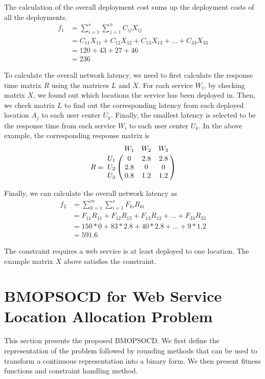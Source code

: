 \documentclass[10pt,journal,compsoc]{IEEEtran}
\let\bbordermatrix\bordermatrix
\begin{document}
The calculation of the overall deployment cost sums up the deployment costs of all the deployments.
\small
\begin{align*}
f_1 & = \sum\limits_{i=1}^s \sum\limits_{j = 1}^n C_{ij} X_{ij}\\
& = C_{11} X_{11} + C_{12} X_{12} + C_{13} X_{13} + ... + C_{33} X_{33} \\
& = 120 + 43 + 27 + 46 \\
& = 236
\end{align*}
 \normalsize

To calculate the overall network latency, we need to first calculate the response time matrix $R$ using the matrices $L$ and $X$. For each service $W_i$, by checking matrix $X$, we found out which locations the service has been deployed in. Then, we check matrix $L$ to find out the corresponding latency from each deployed location $A_j$ to each user center $U_k$. Finally, the smallest latency is selected to be the response time from each service $W_i$ to each user center $U_k$. In the above example, the corresponding response matrix is
\small
$$
R = \bbordermatrix{~ & W_{1} & W_{2} & W_{3}\cr
	U_{1}	&0 &2.8 &2.8	\cr
	U_{2}	&2.8  &0 &0	\cr
	U_{3}	&0.8 &1.2 &1.2	\cr}
$$
\normalsize

Finally, we can calculate the overall network latency as
\small
\begin{equation*}
\begin{aligned}
f_2 & = \sum\limits_{k=1}^m \sum\limits_{i=1}^s F_{ki} R_{ki}\\
  & = F_{11} R_{11} + F_{12} R_{12} + F_{13} R_{13} + ... + F_{33} R_{33} \\
  &= 150 * 0 + 83 * 2.8 + 40 * 2.8 + \dots + 9 * 1.2 \\
  &= 591.6
\end{aligned}
\end{equation*}
\normalsize


The constraint requires a web service is at least deployed to one location. The example matrix $X$ above satisfies the constraint.

\vspace{-3 mm}
\section{BMOPSOCD for Web Service Location Allocation Problem} \label{sec:methods}

This section presents the proposed BMOPSOCD. We first define the representation of the problem followed by rounding methods that can be used to transform a continuous representation into a binary form. We then present fitness functions and constraint handling method.
\end{document}
